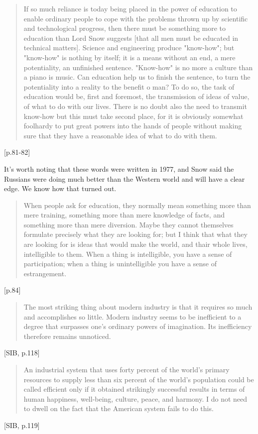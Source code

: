 \documentclass[letterpaper]{article}
\begin{document}
\begin{quote}
If so much reliance is today being placed in the power of education to enable ordinary people to cope with the problems thrown up by scientific and technological progress, then there must be something more to education than Lord Snow suggests [that all men must be educated in technical matters]. Science and engineering produce "know-how"; but "know-how" is nothing by itself; it is a means without an end, a mere potentiality, an unfinished sentence. "Know-how" is no more a culture than a piano is music. Can education help us to finish the sentence, to turn the potentiality into a reality to the benefit o man? To do so, the task of education would be, first and foremost, the transmission of ideas of value, of what to do with our lives. There is no doubt also the need to transmit know-how but this must take second place, for it is obviously somewhat foolhardy to put great powers into the hands of people without making sure that they have a reasonable idea of what to do with them.
\end{quote}[p.81-82]

It's worth noting that these words were written in 1977, and Snow said the Russians were doing much better than the Western world and will have a clear edge. We know how that turned out.

\begin{quote}
When people ask for education, they normally mean something more than mere training, something more than mere knowledge of facts, and something more than mere diversion. Maybe they cannot themselves formulate precisely what they are looking for; but I think that what they are looking for is ideas that would make the world, and thair whole lives, intelligible to them. When a thing is intelligible, you have a sense of participation; when a thing is unintelligible you have a sense of estrangement.
\end{quote}[p.84]

\begin{quote}
  The most striking thing about modern industry is that it requires so much and accomplishes so little. Modern industry seems to be inefficient to a degree that surpasses one's ordinary powers of imagination. Its inefficiency therefore remains unnoticed.
\end{quote} [SIB, p.118]

\begin{quote}
  An industrial system that uses forty percent of the world's primary resources to supply less than six percent of the world's population could be called efficient only if it obtained strikingly successful results in terms of human happiness, well-being, culture, peace, and harmony. I do not need to dwell on the fact that the American system fails to do this.
\end{quote}[SIB, p.119]
\end{document}
